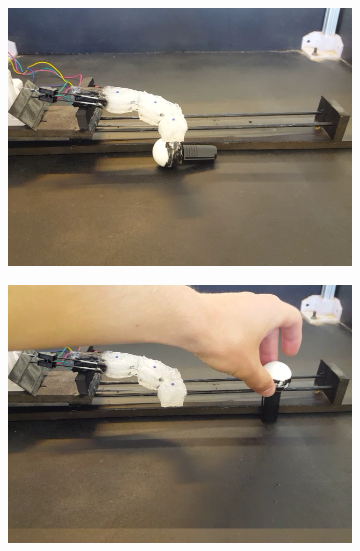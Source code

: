 \documentclass[letterpaper, 10 pt, conference]{ieeeconf}  %
\begin{document}
\begin{figure}[thpb]
        \begin{subfigure}[b]{0.72in} 
                \centering
                \includegraphics[width=\textwidth]{figures/finger/finger6.png}
        \end{subfigure}
        \begin{subfigure}[b]{0.72in}                            
                \centering
                \includegraphics[width=\textwidth]{figures/finger/finger7.png}
        \end{subfigure}
        \begin{subfigure}[b]{0.72in} 
                \centering

\end{subfigure}
\end{figure}
\end{document}
